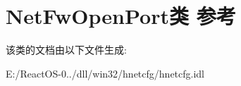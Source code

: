 \hypertarget{class_net_fw_open_port}{}\section{Net\+Fw\+Open\+Port类 参考}
\label{class_net_fw_open_port}


该类的文档由以下文件生成\+:\begin{DoxyCompactItemize}
\item 
E\+:/\+React\+O\+S-\/0../dll/win32/hnetcfg/hnetcfg.\+idl\end{DoxyCompactItemize}
